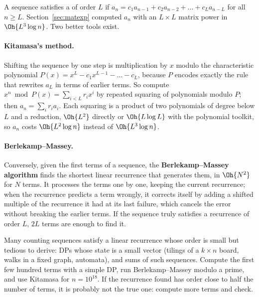 A sequence satisfies a  of order $L$ if $a_n = c_1 a_{n-1} + c_2 a_{n-2} + \dots + c_L a_{n-L}$ for all $n \ge
L$. Section~\ref{sec:matexp} computed $a_n$ with an $L \times L$ matrix power in $\Oh{L^3 \log n}$. Two better tools exist.

\paragraph{Kitamasa's method.} Shifting the sequence by one step is multiplication by $x$ modulo the characteristic polynomial $P(x) =
x^L - c_1 x^{L-1} - \dots - c_L$, because $P$ encodes exactly the rule that rewrites $a_L$ in terms of earlier terms. So compute $x^n
\bmod P(x) = \sum_{i<L} r_i x^i$ by repeated squaring of polynomials modulo $P$; then $a_n = \sum_i r_i a_i$. Each squaring is a product
of two polynomials of degree below $L$ and a reduction, $\Oh{L^2}$ directly or $\Oh{L \log L}$ with the polynomial toolkit, so $a_n$
costs $\Oh{L^2 \log n}$ instead of $\Oh{L^3 \log n}$.

\paragraph{Berlekamp--Massey.} Conversely, given the first terms of a sequence, the \textbf{Berlekamp--Massey algorithm} finds the
shortest linear recurrence that generates them, in $\Oh{N^2}$ for $N$ terms. It processes the terms one by one, keeping the current
recurrence; when the recurrence predicts a term wrongly, it corrects itself by adding a shifted multiple of the recurrence it had at its
last failure, which cancels the error without breaking the earlier terms. If the sequence truly satisfies a recurrence of order $L$,
$2L$ terms are enough to find it.


\begin{trick}
Many counting sequences satisfy a linear recurrence whose order is small but tedious to derive: DPs whose state is a small vector (tilings
of a $k \times n$ board, walks in a fixed graph, automata), and sums of such sequences. Compute the first few hundred terms with a simple
DP, run Berlekamp--Massey modulo a prime, and use Kitamasa for $n = 10^{18}$. If the recurrence found has order close to half the number
of terms, it is probably not the true one: compute more terms and check.
\end{trick}

